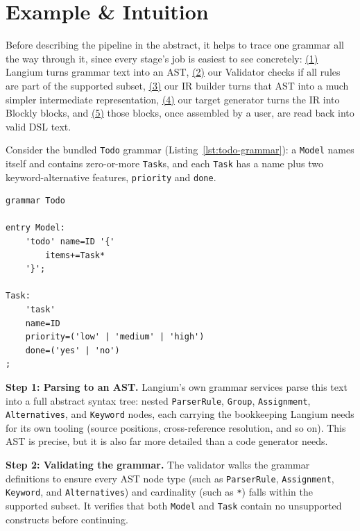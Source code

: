\documentclass[runningheads]{llncs}
\begin{document}
\section{Example \& Intuition}
\label{sec:example}

Before describing the pipeline in the abstract, it helps to trace one grammar all the way through it, since every stage's job is easiest to see concretely: \hyperref[step1]{(1)} Langium turns grammar text into an AST, \hyperref[step2]{(2)} our Validator checks if all rules are part of the supported subset, \hyperref[step3]{(3)} our IR builder turns that AST into a much simpler intermediate representation, \hyperref[step4]{(4)} our target generator turns the IR into Blockly blocks, and \hyperref[step5]{(5)} those blocks, once assembled by a user, are read back into valid DSL text.

Consider the bundled \texttt{Todo} grammar (Listing~\ref{lst:todo-grammar}): a \texttt{Model} names itself and contains zero-or-more \texttt{Task}s, and each \texttt{Task} has a name plus two keyword-alternative features, \texttt{priority} and \texttt{done}.

\newpage

\begin{lstlisting}[caption=The bundled \texttt{todo\_list.langium} example grammar, label=lst:todo-grammar]
grammar Todo

entry Model:
    'todo' name=ID '{'
        items+=Task*
    '}';

Task:
    'task'
    name=ID
    priority=('low' | 'medium' | 'high')
    done=('yes' | 'no')
;
\end{lstlisting}

\textbf{Step 1: Parsing to an AST.}\label{step1} Langium's own grammar services parse this text into a full abstract syntax tree: nested \texttt{ParserRule}, \texttt{Group}, \texttt{Assignment}, \texttt{Alternatives}, and \texttt{Keyword} nodes, each carrying the bookkeeping Langium needs for its own tooling (source positions, cross-reference resolution, and so on). This AST is precise, but it is also far more detailed than a code generator needs.

\textbf{Step 2: Validating the grammar.}\label{step2} The validator walks the grammar definitions to ensure every AST node type (such as \texttt{ParserRule}, \texttt{Assignment}, \texttt{Keyword}, and \texttt{Alternatives}) and cardinality (such as \texttt{*}) falls within the supported subset. It verifies that both \texttt{Model} and \texttt{Task} contain no unsupported constructs before continuing.
\end{document}
